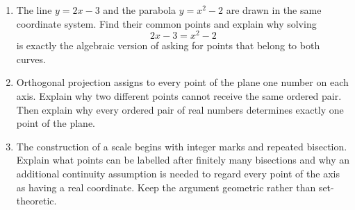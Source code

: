 \begin{enumerate}
\item The line $y=2x-3$ and the parabola $y=x^2-2$ are drawn in the same coordinate
system. Find their common points and explain why solving
\[
2x-3=x^2-2
\]
is exactly the algebraic version of asking for points that belong to both
curves.

\item Orthogonal projection assigns to every point of the plane one number on each
axis. Explain why two different points cannot receive the same ordered pair.
Then explain why every ordered pair of real numbers determines exactly one point
of the plane.

\item The construction of a scale begins with integer marks and repeated
bisection. Explain what points can be labelled after finitely many bisections and
why an additional continuity assumption is needed to regard every point of the
axis as having a real coordinate. Keep the argument geometric rather than
set-theoretic.

\end{enumerate}
